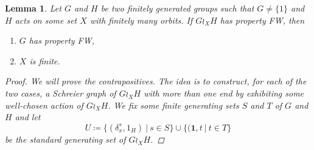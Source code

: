 \documentclass[a4paper]{article}
\newtheorem{lem}{Lemma}[section]
\theoremstyle{definition}
\theoremstyle{remark}%
\newcommand{\setst}[2]{\{#1\ |\ #2\}}
\begin{document}
%
%
\begin{lem}\label{Lem:Wreath_groups_ends}
Let $G$ and $H$ be two finitely generated groups such that $G\neq \{1\}$ and $H$ acts on some set $X$ with finitely many orbits.
If $G\wr_XH$ has property FW, then 
\begin{enumerate}
\item $G$ has property FW,
\item $X$ is finite.
\end{enumerate}
%
\begin{proof}
We will prove the contrapositives. The idea is to construct, for each of the two cases, a Schreier graph of $G\wr_XH$ with more than one end by exhibiting some well-chosen action of $G\wr_XH$.
We fix some finite generating sets $S$ and $T$ of $G$ and $H$ and let 
\[U\coloneqq\setst{(\delta_x^s,1_H)}{s \in S} \cup \setst{(\mathbf 1,t}{t \in T}\]
be the standard generating set of $G\wr_XH$.


\end{proof}
\end{lem}
\end{document}
